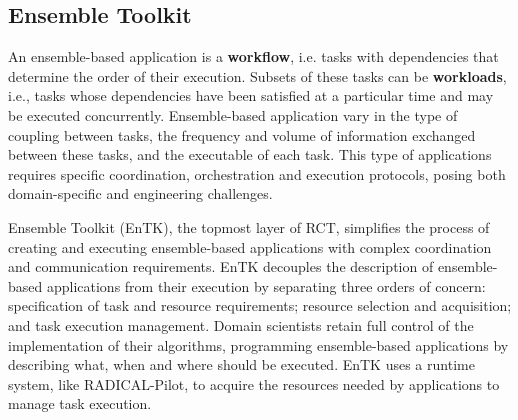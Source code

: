 \subsection{Ensemble Toolkit}\label{ssec:entk}

An ensemble-based application is a \textbf{workflow}, i.e. tasks
with dependencies that determine the order of their execution. Subsets of
these tasks can be \textbf{workloads}, i.e., tasks whose dependencies have
been satisfied at a particular time and may be executed concurrently.
Ensemble-based application vary in the type of coupling between tasks, the
frequency and volume of information exchanged between these tasks, and the
executable of each task. This type of applications requires specific
coordination, orchestration and execution protocols, posing both
domain-specific and engineering challenges.

Ensemble Toolkit (EnTK), the topmost layer of RCT, simplifies the process of
creating and executing ensemble-based applications with complex coordination
and communication requirements. EnTK decouples the description of
ensemble-based applications from their execution by separating three orders
of concern: specification of task and resource requirements; resource
selection and acquisition; and task execution management. 
Domain scientists retain full control of the implementation of their
algorithms, programming ensemble-based applications by describing what, when
and where should be executed. EnTK uses a runtime system, like RADICAL-Pilot,
to acquire the resources needed by applications to manage task execution.



